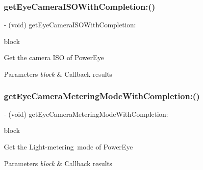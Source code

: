 \subsubsection{\texorpdfstring{get\+Eye\+Camera\+I\+S\+O\+With\+Completion\+:()}{getEyeCameraISOWithCompletion:()}}
{\footnotesize\ttfamily -\/ (void) get\+Eye\+Camera\+I\+S\+O\+With\+Completion\+: \begin{DoxyParamCaption}\item[{(void($^\wedge$)(P\+V\+Eye\+Camera\+I\+SO iso, N\+S\+Error $\ast$\+\_\+\+Nullable error))}]{block }\end{DoxyParamCaption}}

Get the camera I\+SO of Power\+Eye


\begin{DoxyParams}{Parameters}
{\em block} & Callback results \\
\hline
\end{DoxyParams}
\mbox{\label{interface_p_v_eye_camera_ab5b4e0c25271fe9c926952a66471c7af}} 
\subsubsection{\texorpdfstring{get\+Eye\+Camera\+Metering\+Mode\+With\+Completion\+:()}{getEyeCameraMeteringModeWithCompletion:()}}
{\footnotesize\ttfamily -\/ (void) get\+Eye\+Camera\+Metering\+Mode\+With\+Completion\+: \begin{DoxyParamCaption}\item[{(void($^\wedge$)(P\+V\+Eye\+Camera\+Metering\+Mode metering\+Mode, N\+S\+Error $\ast$\+\_\+\+Nullable error))}]{block }\end{DoxyParamCaption}}

Get the Light-\/metering mode of Power\+Eye


\begin{DoxyParams}{Parameters}
{\em block} & Callback results \\
\hline
\end{DoxyParams}
\mbox{\label{interface_p_v_eye_camera_afa4bd832264fe04894eb5e77de01491d}} 
